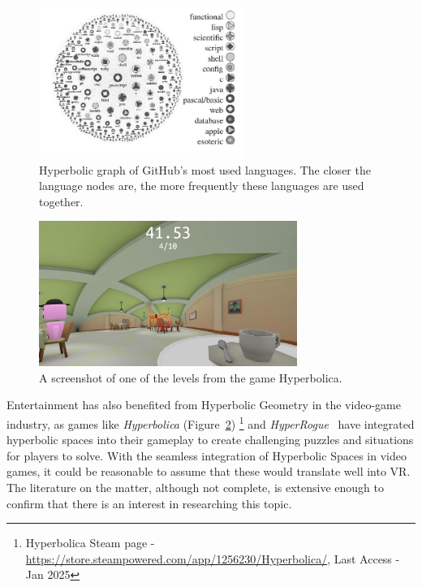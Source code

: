 \begin{figure}[t]
    \centering
     \includegraphics[width=0.6\textwidth]{NOVAthesisFiles/Images/papers/github.png}
     \caption[Hyperbolic graph of GitHub's most used languages]{Hyperbolic graph of GitHub's most used languages. The closer the language nodes are, the more frequently these 
     languages are used together.~\cite{Celiska2017}}
    \label{fig:github}
 \end{figure}

 \begin{figure}[b]
     \centering
      \includegraphics[width=0.75\textwidth]{NOVAthesisFiles/Images/papers/hyperbolica.png}
      \caption[Screenshot of one of the levels from the game Hyperbolica.]{A screenshot of one of the levels from the game Hyperbolica.}
     \label{fig:hyperbolica}
  \end{figure} 

Entertainment has also benefited from Hyperbolic Geometry in the video-game industry, as games like \textit{Hyperbolica} (Figure~\ref{fig:hyperbolica})
\footnote{Hyperbolica Steam page - \href{https://store.steampowered.com/app/1256230/Hyperbolica/}{https://store.steampowered.com/app/1256230/Hyperbolica/}, Last Access - Jan 2025 } 
and \textit{HyperRogue}~\cite{Eryk2017}
have integrated hyperbolic spaces into their gameplay to create challenging puzzles and situations for players to solve. 
With the seamless integration of Hyperbolic Spaces in video games, 
it could be reasonable to assume that these would translate well into \gls{VR}. The literature on the matter, although not complete, 
is extensive enough to confirm that there is an interest in researching this topic.


